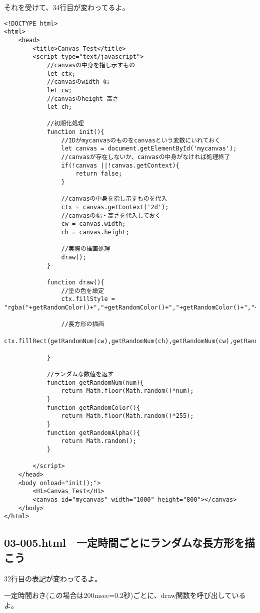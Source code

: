 \documentclass[mingoth,11pt,a4j,uplatex]{jsarticle}
\begin{document}
それを受けて、34行目が変わってるよ。
\begin{lstlisting}[caption=リロードする度に色違いのランダムな長方形を描こう]
<!DOCTYPE html>
<html>
	<head>
		<title>Canvas Test</title>
		<script type="text/javascript">
			//canvasの中身を指し示すもの
			let ctx;
			//canvasのwidth 幅
			let cw;
			//canvasのheight 高さ
			let ch;
			
			//初期化処理
			function init(){
				//IDがmycanvasのものをcanvasという変数にいれておく
				let canvas = document.getElementById('mycanvas');
				//canvasが存在しないか、canvasの中身がなければ処理終了
				if(!canvas ||!canvas.getContext){
					return false;
				}
				
				//canvasの中身を指し示すものを代入
				ctx = canvas.getContext('2d');
				//canvasの幅・高さを代入しておく
				cw = canvas.width;
				ch = canvas.height;
				
				//実際の描画処理
				draw();
			}
			
			function draw(){
				//塗の色を設定
				ctx.fillStyle = "rgba("+getRandomColor()+","+getRandomColor()+","+getRandomColor()+","+getRandomAlpha()+")";
				
				//長方形の描画
				ctx.fillRect(getRandomNum(cw),getRandomNum(ch),getRandomNum(cw),getRandomNum(ch));

			}
			
			//ランダムな数値を返す
			function getRandomNum(num){
				return Math.floor(Math.random()*num);
			}
			function getRandomColor(){
				return Math.floor(Math.random()*255);
			}
			function getRandomAlpha(){
				return Math.random();
			}

		</script>
	</head>
	<body onload="init();">
		<H1>Canvas Test</H1>
		<canvas id="mycanvas" width="1000" height="800"></canvas>
	</body>
</html>
\end{lstlisting}

\subsection{03-005.html　一定時間ごとにランダムな長方形を描こう}
32行目の表記が変わってるよ。

一定時間おき(この場合は200msec=0.2秒)ごとに、draw関数を呼び出しているよ。
\end{document}
